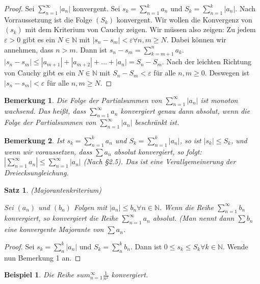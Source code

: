 \documentclass[a4paper,10pt]{article}
\newtheorem{notice}{Bemerkung}
\newtheorem{example}{Beispiel}
\newtheorem{satz}{Satz}
\begin{document}
\begin{proof}
 Sei $\sum_{n = 1}^\infty |a_n|$ konvergent.
 Sei $s_k = \sum_{n = 1}^k a_n$ und $S_k = \sum_{n = 1}^k |a_n|$.
 Nach Vorraussetzung ist die Folge $(S_k)$ konvergent.
 Wir wollen die Konvergenz von $(s_k)$ mit dem Kriterium von Cauchy zeigen.
 Wir müssen also zeigen: Zu jedem $\varepsilon > 0$ gibt es ein $N \in \mathbb{N}$ mit $|s_n - s_m| < \varepsilon \forall n, m \ge N$.
 Dabei können wir annehmen, dass $n > m$.
 Dann ist $s_n - s_m = \sum_{k = m + 1}^n a_k$.
 $|s_n - s_m| \le |a_{m + 1}| + |a_{m + 2}| + \dots + |a_n| = S_n - S_m$.
 Nach der leichten Richtung von Cauchy gibt es ein $N \in \mathbb{N}$ mit $S_n - S_m < \varepsilon$ für alle $n, m \ge 0$.
 Deswegen ist $|s_n - s_m| < \varepsilon$ für alle $n, m \ge N$.
\end{proof}

\begin{notice}
 Die Folge der Partialsummen von $\sum_{n = 1}^\infty |a_n|$ ist monoton wachsend.
 Das heißt, dass $\sum_{n = 1}^\infty a_n$ konvergiert genau dann absolut, wenn die Folge der Partialsummen von $\sum_{n = 1}^\infty |a_n|$ beschränkt ist.
\end{notice}

\begin{notice}
 Ist $s_k = \sum_{n = 1}^k a_n$ und $S_k = \sum_{n = 1}^k |a_n|$, so ist $|s_k| \le S_k$, und wenn wir voraussetzen, dass $\sum a_n$ absolut konvergiert, so folgt: $|\sum_{n = 1}^\infty a_n| \le \sum_{n = 1}^\infty |a_n|$ (Nach §2.5).
 Das ist eine Verallgemeinerung der Dreiecksungleichung.
\end{notice}

\begin{satz}
 (Majorantenkriterium)
 
 Sei $(a_n)$ und $(b_n)$ Folgen mit $|a_n| \le b_n \forall n \in \mathbb{N}$.
 Wenn die Reihe $\sum_{n = 1}^\infty b_n$ konvergiert, so konvergiert die Reihe $\sum_{n = 1}^\infty a_n$ absolut.
 (Man nennt dann $\sum b_n$ eine konvergente Majorante von $\sum a_n$.
\end{satz}

\begin{proof}
 Sei $s_k = \sum_n^k |a_n|$ und $S_k = \sum_n^k b_n$.
 Dann ist $0 \le s_k \le S_k \forall k \in \mathbb{N}$.
 Wende nun Bemerkung 1 an.
\end{proof}

\begin{example}
 Die Reihe $sum_{n = 1}^\infty \frac{1}{n^2}$ konvergiert.
\end{example}
\end{document}
